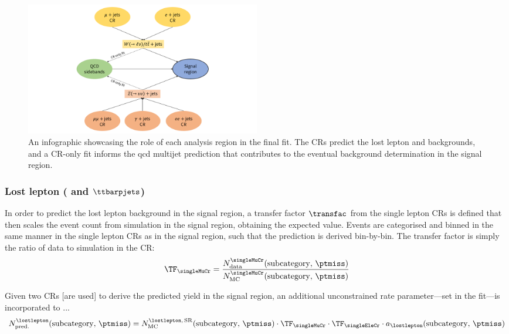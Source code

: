 \begin{figure}[htbp]
    \centering
    \includegraphics[width=0.5\textwidth]{figures/fit_overview.pdf}
    \caption[An infographic showcasing the role of each analysis region in the final fit]{An infographic showcasing the role of each analysis region in the final fit. The \glspl{CR} predict the lost lepton and \ztonunu backgrounds, and a \gls{CR}-only fit informs the \acrshort{qcd} multijet prediction that contributes to the eventual background determination in the signal region.}
    \label{fig:htoinv_fit_overview}
\end{figure}




\subsubsection{Lost lepton (\texorpdfstring{\PW}{W} and \texorpdfstring{$\ttbarpjets$}{ttbar plus jets})}
\label{subsubsec:htoinv_lost_lepton_bkg}

In order to predict the lost lepton background in the signal region, a transfer factor $\transfac$ from the single lepton \glspl{CR} is defined that then scales the event count from simulation in the signal region, obtaining the expected value. Events are categorised and binned in the same manner in the single lepton \glspl{CR} as in the signal region, such that the prediction is derived bin-by-bin. The transfer factor is simply the ratio of data to simulation in the \gls{CR}:
\begin{equation}
    \TF_{\singleMuCr} = \frac{ N_{\mathrm{data}}^{\singleMuCr}(\mathrm{subcategory}, \, \ptmiss) }{ N_{\mathrm{MC}}^{\singleMuCr}(\mathrm{subcategory}, \, \ptmiss) }
\end{equation}

Given two \glspl{CR} [are used] to derive the predicted yield in the signal region, an additional unconstrained rate parameter---set in the fit---is incorporated to ...
\begin{equation}
    N_{\mathrm{pred.}}^{\lostlepton}(\mathrm{subcategory}, \, \ptmiss) = N_{\mathrm{MC}}^{\lostlepton, \, \mathrm{SR}}(\mathrm{subcategory}, \, \ptmiss) \cdot \TF_{\singleMuCr} \cdot \TF_{\singleEleCr} \cdot a_{\lostlepton}(\mathrm{subcategory}, \, \ptmiss)
\end{equation}

